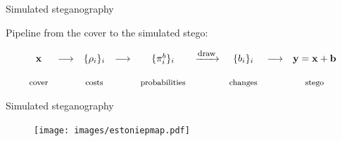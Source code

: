 \documentclass[10pt]{beamer}
\begin{document}
\begin{frame}{Simulated steganography}

Pipeline from the cover to the simulated stego:

\begin{equation*}
\begin{array}{ccccccccc}
    \mathbf{x} & \longrightarrow & \{\rho_i\}_i & \longrightarrow & \{\pi_i^b\}_i &   \xrightarrow{\mbox{\footnotesize{draw}}} & \{b_i\}_i &  \longrightarrow & \mathbf{y} = \mathbf{x} + \mathbf{b} \\ \\
    \mbox{\footnotesize{cover}} & & \mbox{\footnotesize{costs}} & & \mbox{\footnotesize{probabilities}} & & \mbox{\footnotesize{changes}} & &  \mbox{\footnotesize{stego}}
    
\end{array}
\end{equation*}
\end{frame}


\begin{frame}{Simulated steganography}
\begin{figure}[h]
\texttt{[image: images/estoniepmap.pdf]}
\end{figure}
\end{frame}


    
\end{document}
